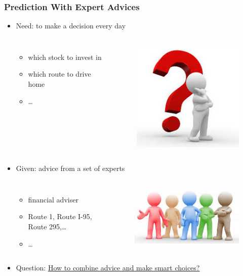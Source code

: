\documentclass{beamer}
\begin{document}
\begin{frame}
\frametitle{Prediction With Expert Advices}

\begin{itemize}
\item Need: to make a decision every day
\begin{columns}
	\begin{itemize}
	\item which stock to invest in
	\item which route to drive home
	\item \ldots
	\end{itemize}
\begin{figure}
\includegraphics[scale = 0.25]{question}
\end{figure}
\end{columns}
\pause
\item Given: advice from a set of experts
	\begin{columns}
	\begin{itemize}
	\item financial adviser
	\item Route 1, Route I-95, Route 295,\ldots
	\item \ldots
	\end{itemize}
	\begin{figure}
\includegraphics[scale = 0.25]{experts}
\end{figure}
\end{columns}
\pause	
\item Question:
	\underline{How to combine advice and make smart choices?}
\end{itemize}

\end{frame}
\end{document}
